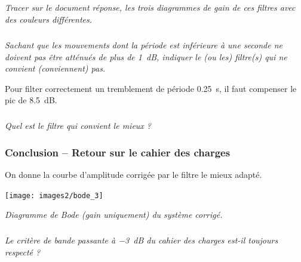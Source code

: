 \documentclass[10pt,fleqn]{article} %
\begin{document}
\subparagraph{}\textit{Tracer sur le document réponse, les trois diagrammes de gain de ces filtres avec des couleurs différentes.}

\subparagraph{}\textit{Sachant que les mouvements dont la période est inférieure à une seconde ne doivent pas être atténués de plus de \SI{1}{dB},
	indiquer le (ou les) filtre(s) qui ne convient (conviennent) pas.}

Pour filter correctement un tremblement de période \SI{0,25}{s}, il faut compenser le pic de \SI{8,5}{dB}.

\subparagraph{}\textit{Quel est le filtre qui convient le mieux ?}





\subsubsection*{Conclusion  -- Retour sur le cahier des charges}
On donne la courbe d'amplitude corrigée par le filtre le mieux adapté.

\begin{center}
	\texttt{[image: images2/bode\_3]}

\textit{Diagramme de Bode (gain uniquement) du système corrigé.}
\end{center}


\subparagraph{}
\textit{Le critère de bande passante à \SI{-3}{dB} du cahier des charges est-il toujours respecté ?}
\end{document}
